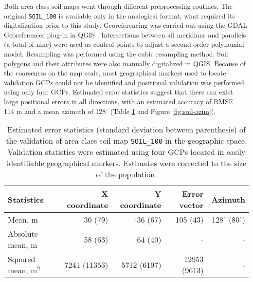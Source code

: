 Both area-class soil maps went through different preprocessing routines. The original \texttt{SOIL\_100} is available only in the analogical format, what required its digitalization prior to this study. Georeferencing was carried out using the GDAL Georeferencer plug-in in QGIS \citep{GDAL2013, QGIS2013}. Intersections between all meridians and parallels (a total of nine) were used as control points to adjust a second order polynomial model. Resampling was performed using the cubic resampling method. Soil polygons and their attributes were also manually digitalized in QGIS. Because of the coarseness on the map scale, most geographical markers used to locate validation GCPs could not be identified and positional validation was performed using only four GCPs. Estimated error statistics suggest that there can exist large positional errors in all directions, with an estimated accuracy of RMSE = 114 m and a mean azimuth of 128$^{\circ}$ (Table \ref{tab:soil-geo-val} and Figure \ref{fig:soil-azim}).

\begin{table}[ht]
  \caption{Estimated error statistics (standard deviation between parenthesis) of the validation of area-class soil map \texttt{SOIL\_100} in the geographic space. Validation statistics were estimated using four GCPs located in easily identifiable geographical markers. Estimates were corrected to the size of the population.}
  \label{tab:soil-geo-val}
  \centering
  {\small
  \begin{tabular}{lrrrr}
    \hline
    Statistics           & X coordinate & Y coordinate & Error vector & Azimuth                  \\
    \hline
    Mean, m              & 30   (79)    & -36  (67)    & 105   (43)   & 128$^\circ$ (80$^\circ$) \\ 
    Absolute mean, m     & 58   (63)    & 64   (40)    & -            & -                        \\ 
    Squared mean, m$^2$  & 7241 (11353) & 5712 (6197)  & 12953 (9613) & -                        \\ 
    \hline
  \end{tabular}}
\end{table}


